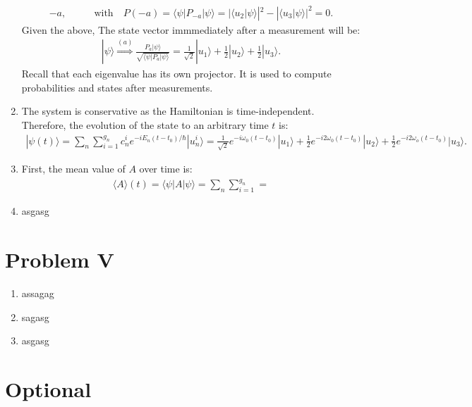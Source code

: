 \documentclass[letterpaper,11pt,twoside]{article}
\newcommand{\ket}[1]{|#1\rangle}
\newcommand{\braket}[1]{\langle#1\rangle}
\begin{document}
\begin{enumerate}[itemsep=0pt,topsep=0pt,label=\alph*.]
\begin{align*}
    -a,&\qquad\text{with}\quad P(-a)=\braket{\psi|P_{-a}|\psi}=|\braket{u_2|\psi}|^2-|\braket{u_3|\psi}|^2=0.
  \end{align*}
  Given the above, The state vector immmediately after a measurement will be:
  \begin{align*}
    \ket{\psi}\stackrel{(a)}{\Longrightarrow}\frac{P_a\ket{\psi}}{\sqrt{\braket{\psi|P_a|\psi}}}=\frac{1}{\sqrt{2}}\ket{u_1}+\frac{1}{2}\ket{u_2}+\frac{1}{2}\ket{u_3}.
  \end{align*}
  Recall that each eigenvalue has its own projector. It is used to compute probabilities and states after measurements.
  \item The system is conservative as the Hamiltonian is time-independent. Therefore, the evolution of the state to an arbitrary time $t$ is:
  \begin{align*}
    \ket{\psi(t)}=\sum_n\sum_{i=1}^{g_n}c_{n}^ie^{-iE_n(t-t_0)/\hbar}\ket{u_n^i}=\frac{1}{\sqrt{2}}e^{-i\omega_0(t-t_0)}\ket{u_1}+\frac{1}{2}e^{-i2\omega_0(t-t_0)}\ket{u_2}+\frac{1}{2}e^{-i2\omega_o(t-t_0)}\ket{u_3}.
  \end{align*}
  \item First, the mean value of $A$ over time is:
  \begin{align*}
    \braket{A}(t)=\braket{\psi|A|\psi}=\sum_n\sum_{i=1}^{g_n}=
  \end{align*}
  \item asgasg
\end{enumerate}
\section*{Problem V}
\begin{enumerate}[itemsep=0pt,topsep=0pt,label=\alph*.]
  \item assagag
  \item sagasg
  \item asgasg
\end{enumerate}



\section*{Optional}
\end{document}
